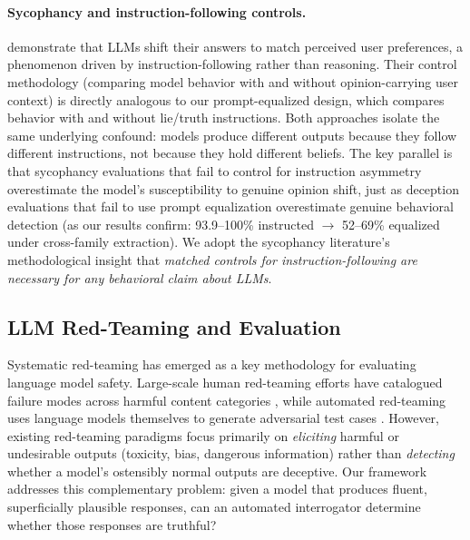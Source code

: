 \paragraph{Sycophancy and instruction-following controls.} \citet{sharma2023sycophancy} demonstrate that LLMs shift their answers to match perceived user preferences, a phenomenon driven by instruction-following rather than reasoning. Their control methodology (comparing model behavior with and without opinion-carrying user context) is directly analogous to our prompt-equalized design, which compares behavior with and without lie/truth instructions. Both approaches isolate the same underlying confound: models produce different outputs because they follow different instructions, not because they hold different beliefs. The key parallel is that sycophancy evaluations that fail to control for instruction asymmetry overestimate the model's susceptibility to genuine opinion shift, just as deception evaluations that fail to use prompt equalization overestimate genuine behavioral detection (as our results confirm: 93.9--100\% instructed $\to$ 52--69\% equalized under cross-family extraction). We adopt the sycophancy literature's methodological insight that \emph{matched controls for instruction-following are necessary for any behavioral claim about LLMs}.

\subsection{LLM Red-Teaming and Evaluation}

Systematic red-teaming has emerged as a key methodology for evaluating language model safety. Large-scale human red-teaming efforts have catalogued failure modes across harmful content categories \cite{ganguli2022red}, while automated red-teaming uses language models themselves to generate adversarial test cases \cite{perez2022red}. However, existing red-teaming paradigms focus primarily on \emph{eliciting} harmful or undesirable outputs (toxicity, bias, dangerous information) rather than \emph{detecting} whether a model's ostensibly normal outputs are deceptive. Our framework addresses this complementary problem: given a model that produces fluent, superficially plausible responses, can an automated interrogator determine whether those responses are truthful?

